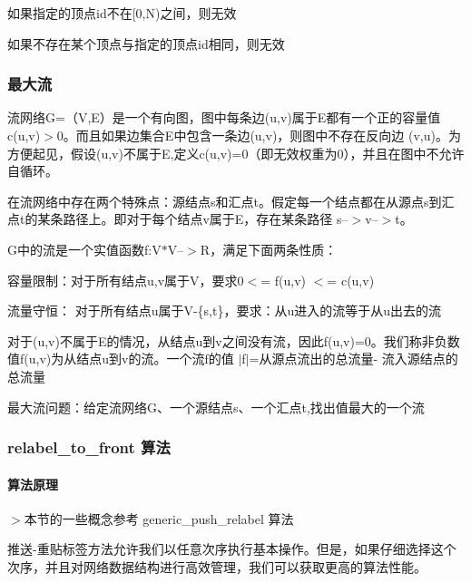 \begin{DoxyItemize}
\item 如果指定的顶点{\ttfamily id}不在{\ttfamily \mbox{[}0,N)}之间，则无效
\item 如果不存在某个顶点与指定的顶点{\ttfamily id}相同，则无效
\end{DoxyItemize}

\subsubsection*{最大流}

流网络\+G=（\+V,E）是一个有向图，图中每条边(u,v)属于\+E都有一个正的容量值c(u,v)$>$0。而且如果边集合\+E中包含一条边(u,v)，则图中不存在反向边 (v,u)。为方便起见，假设(u,v)不属于\+E,定义c(u,v)=0（即无效权重为0），并且在图中不允许自循环。

在流网络中存在两个特殊点：源结点s和汇点t。假定每一个结点都在从源点s到汇点t的某条路径上。即对于每个结点v属于\+E，存在某条路径 s--$>$v--$>$t。

G中的流是一个实值函数f\+:V$\ast$\+V--$>$R，满足下面两条性质：


\begin{DoxyItemize}
\item 容量限制：对于所有结点u,v属于\+V，要求0$<$= f(u,v) $<$= c(u,v)
\item 流量守恒： 对于所有结点u属于\+V-\/\{s,t\}，要求：从u进入的流等于从u出去的流
\end{DoxyItemize}

对于(u,v)不属于\+E的情况，从结点u到v之间没有流，因此f(u,v)=0。我们称非负数值f(u,v)为从结点u到v的流。一个流f的值 $\vert$f$\vert$=从源点流出的总流量-\/ 流入源结点的总流量

最大流问题：给定流网络\+G、一个源结点s、一个汇点t,找出值最大的一个流

\subsubsection*{relabel\+\_\+to\+\_\+front 算法}

\paragraph*{算法原理}

$>$本节的一些概念参考 generic\+\_\+push\+\_\+relabel 算法

推送-\/重贴标签方法允许我们以任意次序执行基本操作。但是，如果仔细选择这个次序，并且对网络数据结构进行高效管理，我们可以获取更高的算法性能。

